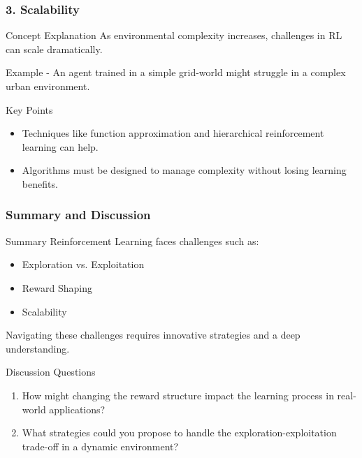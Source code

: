 \documentclass[aspectratio=169]{beamer}
\begin{document}
\begin{frame}[fragile]
    \frametitle{3. Scalability}
    
    \begin{block}{Concept Explanation}
        As environmental complexity increases, challenges in RL can scale dramatically.
    \end{block}

    \begin{block}{Example}
        - An agent trained in a simple grid-world might struggle in a complex urban environment.
    \end{block}

    \begin{block}{Key Points}
        \begin{itemize}
            \item Techniques like function approximation and hierarchical reinforcement learning can help.
            \item Algorithms must be designed to manage complexity without losing learning benefits.
        \end{itemize}
    \end{block}
\end{frame}

\begin{frame}[fragile]
    \frametitle{Summary and Discussion}
    
    \begin{block}{Summary}
        Reinforcement Learning faces challenges such as:
        \begin{itemize}
            \item Exploration vs. Exploitation
            \item Reward Shaping
            \item Scalability
        \end{itemize}
        Navigating these challenges requires innovative strategies and a deep understanding.
    \end{block}

    \begin{block}{Discussion Questions}
        \begin{enumerate}
            \item How might changing the reward structure impact the learning process in real-world applications?
            \item What strategies could you propose to handle the exploration-exploitation trade-off in a dynamic environment?
        \end{enumerate}
    \end{block}
\end{frame}
\end{document}
